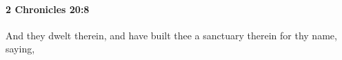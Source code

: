 
		\paragraph{2 Chronicles 20:8} %
			\label{2CHRONICLES-20-8}

			And they dwelt therein, and have built thee a sanctuary therein for thy name, saying,


